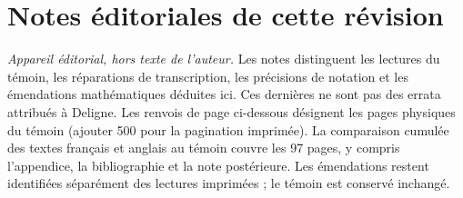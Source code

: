 \documentclass[10pt,letterpaper]{article}
\begin{document}
\section*{Notes éditoriales de cette révision}
\noindent\textit{Appareil éditorial, hors texte de l'auteur.}
Les notes distinguent les lectures du témoin, les réparations de transcription,
les précisions de notation et les émendations mathématiques déduites ici.
Ces dernières ne sont pas des errata attribués à Deligne. Les renvois de page
ci-dessous désignent les pages physiques du témoin (ajouter 500 pour la pagination imprimée).
La comparaison cumulée des textes français et anglais au témoin couvre les 97 pages,
y compris l'appendice, la bibliographie et la note postérieure. Les émendations
restent identifiées séparément des lectures imprimées ; le témoin est conservé inchangé.
\end{document}
